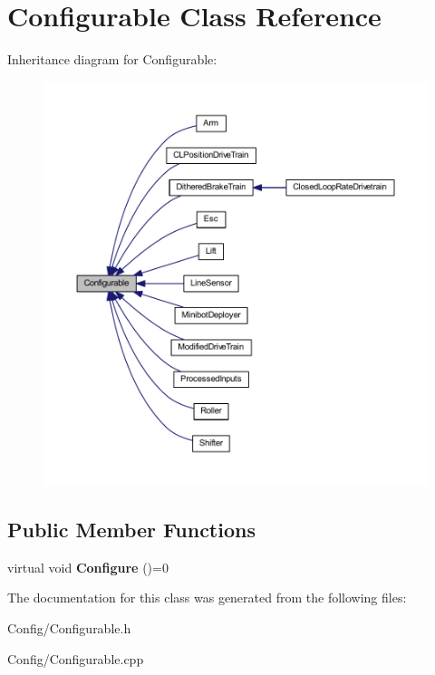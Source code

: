 \hypertarget{class_configurable}{
\section{\-Configurable \-Class \-Reference}
\label{class_configurable}
}


\-Inheritance diagram for \-Configurable\-:\nopagebreak
\begin{figure}[H]
\begin{center}
\leavevmode
\includegraphics[width=350pt]{class_configurable__inherit__graph}
\end{center}
\end{figure}
\subsection*{\-Public \-Member \-Functions}
\begin{DoxyCompactItemize}
\item 
\hypertarget{class_configurable_a951fdca310cfb5e2090ca10734a181e1}{
virtual void {\bfseries \-Configure} ()=0}
\label{class_configurable_a951fdca310cfb5e2090ca10734a181e1}

\end{DoxyCompactItemize}


\-The documentation for this class was generated from the following files\-:\begin{DoxyCompactItemize}
\item 
\-Config/\-Configurable.\-h\item 
\-Config/\-Configurable.\-cpp\end{DoxyCompactItemize}
